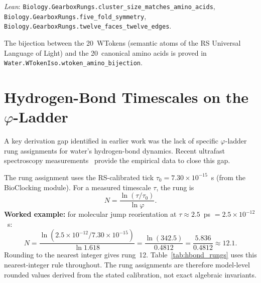 \documentclass[12pt,a4paper]{article}
\theoremstyle{definition}
\theoremstyle{remark}
\begin{document}
\noindent
\textit{Lean}: \texttt{Biology.GearboxRungs.cluster\_size\_matches\_amino\_acids},
\texttt{Biology.GearboxRungs.five\_fold\_symmetry},
\texttt{Biology.GearboxRungs.twelve\_faces\_twelve\_edges}.

The bijection between the 20~WTokens (semantic atoms of the RS
Universal Language of Light) and the 20~canonical amino acids is
proved in \texttt{Water.WTokenIso.wtoken\_amino\_bijection}.

\section[Hydrogen-Bond Timescales on the Phi Ladder]{Hydrogen-Bond Timescales on the $\varphi$-Ladder}
\label{sec:timescales}

A key derivation gap identified in earlier
work was the lack of specific
$\varphi$-ladder rung assignments for water's hydrogen-bond dynamics.
Recent ultrafast spectroscopy measurements~\cite{Gaynor2024,Yang2025,
Nihonyanagi2021} provide the empirical data to close this gap.

The rung assignment uses the RS-calibrated tick
$\tau_0 = 7.30 \times 10^{-15}$~s (from the BioClocking module).
For a measured timescale $\tau$, the rung is
\begin{equation}\label{eq:rungcalc}
  N = \frac{\ln(\tau / \tau_0)}{\ln \varphi}.
\end{equation}
\textbf{Worked example:} for molecular jump reorientation at
$\tau \approx 2.5$~ps $= 2.5 \times 10^{-12}$~s:
\begin{equation}
  N = \frac{\ln(2.5 \times 10^{-12} / 7.30 \times 10^{-15})}{\ln 1.618}
  = \frac{\ln(342.5)}{0.4812}
  = \frac{5.836}{0.4812}
  \approx 12.1.
\end{equation}
Rounding to the nearest integer gives rung~12.  Table~\ref{tab:hbond_rungs}
uses this nearest-integer rule throughout.  The rung assignments are
therefore model-level rounded values derived from the stated
calibration, not exact algebraic invariants.
\end{document}
